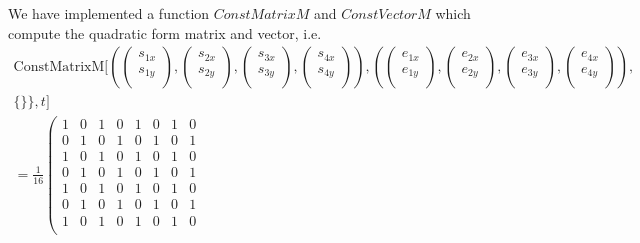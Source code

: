 \documentclass[8pt]{article}
\begin{document}
\begin{screen}
 We have implemented a function $ConstMatrixM$ and $ConstVectorM$ which compute the
 quadratic form matrix and vector, i.e.
\begin{eqnarray*}
\text{ConstMatrixM}[(\left(\begin{array}{c}
s_{1x}\\
s_{1y}\\
\end{array}\right),\left(\begin{array}{c}
s_{2x}\\
s_{2y}\\
\end{array}\right),\left(\begin{array}{c}
s_{3x}\\
s_{3y}\\
\end{array}\right),\left(\begin{array}{c}
s_{4x}\\
s_{4y}\\
\end{array}\right)),(\left(\begin{array}{c}
e_{1x}\\
e_{1y}\\
\end{array}\right),\left(\begin{array}{c}
e_{2x}\\
e_{2y}\\
\end{array}\right),\left(\begin{array}{c}
e_{3x}\\
e_{3y}\\
\end{array}\right),\left(\begin{array}{c}
e_{4x}\\
e_{4y}\\
\end{array}\right)), \\
\{\}\}, t] \\
= \frac{1}{16} 
\left( 
 \begin{array}{cccccccc}
 1&0&1&0&1&0&1&0\\
 0&1&0&1&0&1&0&1\\
 1&0&1&0&1&0&1&0\\
 0&1&0&1&0&1&0&1\\
 1&0&1&0&1&0&1&0\\
 0&1&0&1&0&1&0&1\\
 1&0&1&0&1&0&1&0\\

\end{array}
\end{eqnarray*}
\end{screen}
\end{document}
